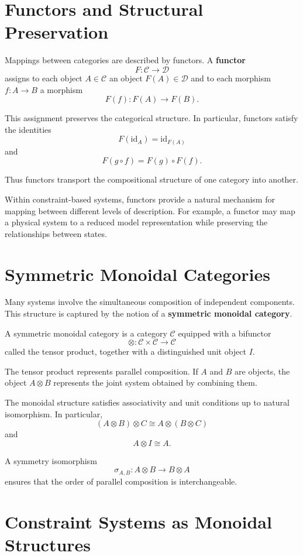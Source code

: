 \documentclass[11pt, openany]{book}
\theoremstyle{plain}
\theoremstyle{definition}
\theoremstyle{remark}
\begin{document}
\section{Functors and Structural Preservation}

Mappings between categories are described by functors.  A
\textbf{functor}
\[
F:\mathcal{C}\to\mathcal{D}
\]
assigns to each object $A\in\mathcal{C}$ an object $F(A)\in\mathcal{D}$
and to each morphism $f:A\to B$ a morphism
\[
F(f):F(A)\to F(B).
\]

This assignment preserves the categorical structure.  In particular,
functors satisfy the identities
\[
F(\mathrm{id}_A)=\mathrm{id}_{F(A)}
\]
and
\[
F(g\circ f)=F(g)\circ F(f).
\]

Thus functors transport the compositional structure of one category into
another.

Within constraint-based systems, functors provide a natural mechanism
for mapping between different levels of description.  For example, a
functor may map a physical system to a reduced model representation
while preserving the relationships between states.

\section{Symmetric Monoidal Categories}

Many systems involve the simultaneous composition of independent
components.  This structure is captured by the notion of a
\textbf{symmetric monoidal category}.

A symmetric monoidal category is a category $\mathcal{C}$ equipped with
a bifunctor
\[
\otimes:\mathcal{C}\times\mathcal{C}\to\mathcal{C}
\]
called the tensor product, together with a distinguished unit object
$I$.

The tensor product represents parallel composition.  If $A$ and $B$ are
objects, the object $A\otimes B$ represents the joint system obtained by
combining them.

The monoidal structure satisfies associativity and unit conditions up to
natural isomorphism.  In particular,
\[
(A\otimes B)\otimes C \cong A\otimes(B\otimes C)
\]
and
\[
A\otimes I \cong A.
\]

A symmetry isomorphism
\[
\sigma_{A,B}:A\otimes B\to B\otimes A
\]
ensures that the order of parallel composition is interchangeable.

\section{Constraint Systems as Monoidal Structures}
\end{document}
